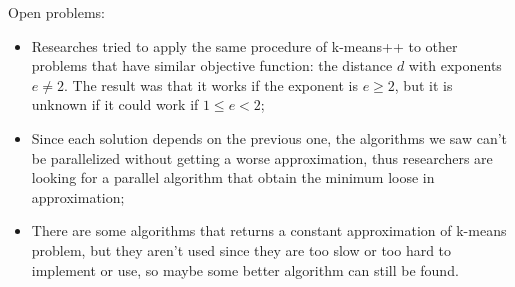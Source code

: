 Open problems:
\begin{itemize}
    \item Researches tried to apply the same procedure of k-means++ to other problems that have similar objective function: the distance $d$ with exponents $e \neq 2$. The result was that it works if the exponent is $e \geq 2$, but it is unknown if it could work if $1 \leq e < 2$;
    \item Since each solution depends on the previous one, the algorithms we saw can't be parallelized without getting a worse approximation, thus researchers are looking for a parallel algorithm that obtain the minimum loose in approximation;
    \item There are some algorithms that returns a constant approximation of k-means problem, but they aren't used since they are too slow or too hard to implement or use, so maybe some better algorithm can still be found.
\end{itemize}
